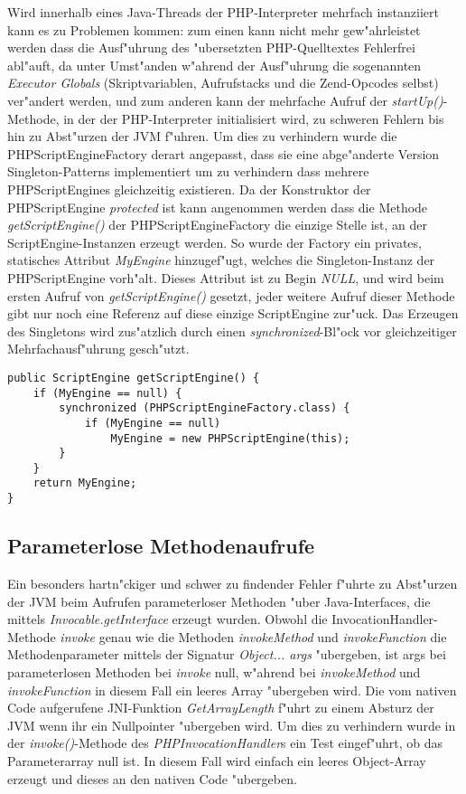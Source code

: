 Wird innerhalb eines Java-Threads der PHP-Interpreter mehrfach instanziiert kann es zu Problemen
kommen: zum einen kann nicht mehr gew"ahrleistet werden dass die Ausf"uhrung des "ubersetzten
PHP-Quelltextes Fehlerfrei abl"auft, da unter Umst"anden w"ahrend der Ausf"uhrung die sogenannten
\emph{Executor Globals} (Skriptvariablen, Aufrufstacks und die Zend-Opcodes selbst) ver"andert werden,
und zum anderen kann der mehrfache Aufruf der \emph{startUp()}-Methode, in der der PHP-Interpreter
initialisiert wird, zu schweren Fehlern bis hin zu Abst"urzen der JVM f"uhren. Um dies zu verhindern
wurde die PHPScriptEngineFactory derart angepasst, dass sie eine abge"anderte Version Singleton-Patterns
implementiert um zu verhindern dass mehrere PHPScriptEngines gleichzeitig existieren. 
Da der Konstruktor der PHPScriptEngine \emph{protected} ist kann angenommen werden dass die 
Methode \emph{getScriptEngine()} der PHPScriptEngineFactory die einzige Stelle ist, an der
ScriptEngine-Instanzen erzeugt werden. So wurde der Factory ein privates, statisches Attribut \emph{MyEngine} 
hinzugef"ugt, welches die Singleton-Instanz der PHPScriptEngine vorh"alt. Dieses Attribut ist zu Begin
\emph{NULL}, und wird beim ersten Aufruf von \emph{getScriptEngine()} gesetzt, jeder weitere Aufruf
dieser Methode gibt nur noch eine Referenz auf diese einzige ScriptEngine zur"uck. Das Erzeugen des
Singletons wird zus"atzlich durch einen \emph{synchronized}-Bl"ock vor gleichzeitiger
Mehrfachausf"uhrung gesch"utzt.
\begin{lstlisting}[caption=Singleton-Erzeugung]
public ScriptEngine getScriptEngine() {
    if (MyEngine == null) {
        synchronized (PHPScriptEngineFactory.class) {
            if (MyEngine == null)
                MyEngine = new PHPScriptEngine(this);
        }
    }
    return MyEngine;
}
\end{lstlisting}

\subsection{Parameterlose Methodenaufrufe}
\label{sec:chap2:turp:params}

Ein besonders hartn"ckiger und schwer zu findender Fehler f"uhrte zu Abst"urzen der JVM beim Aufrufen
parameterloser Methoden "uber Java-Interfaces, die mittels \emph{Invocable.getInterface} erzeugt wurden.
Obwohl die InvocationHandler-Methode \emph{invoke} genau wie die Methoden \emph{invokeMethod} und \emph{invokeFunction}
die Methodenparameter mittels der Signatur \emph{Object... args} "ubergeben, ist args bei parameterlosen Methoden
bei \emph{invoke} null, w"ahrend bei \emph{invokeMethod} und \emph{invokeFunction} in diesem Fall ein leeres Array 
"ubergeben wird. Die vom nativen Code aufgerufene JNI-Funktion \emph{GetArrayLength} f"uhrt zu einem Absturz der
JVM wenn ihr ein Nullpointer "ubergeben wird. Um dies zu verhindern wurde in der \emph{invoke()}-Methode des
\emph{PHPInvocationHandler}s ein Test eingef"uhrt, ob das Parameterarray null ist. In diesem Fall wird einfach
ein leeres Object-Array erzeugt und dieses an den nativen Code "ubergeben.

